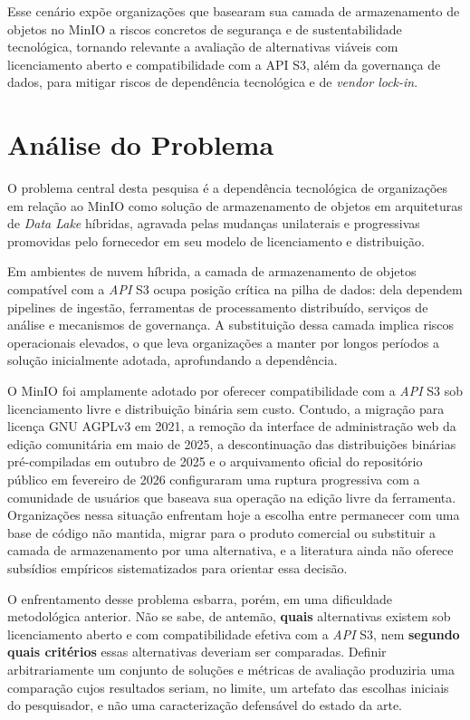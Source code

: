 Esse cenário expõe organizações que basearam sua camada de armazenamento de objetos
no MinIO a riscos concretos de segurança e de sustentabilidade tecnológica,
tornando relevante a avaliação de alternativas viáveis com licenciamento aberto e
compatibilidade com a API S3, além da governança de dados, para mitigar riscos de
dependência tecnológica e de \textit{vendor lock-in}.

\section{Análise do Problema}
\label{sec:analise-problema}

O problema central desta pesquisa é a dependência tecnológica de organizações
em relação ao MinIO como solução de armazenamento de objetos em arquiteturas
de \textit{Data Lake} híbridas, agravada pelas mudanças unilaterais e progressivas
promovidas pelo fornecedor em seu modelo de licenciamento e distribuição.

Em ambientes de nuvem híbrida, a camada de armazenamento de objetos compatível
com a \textit{API} S3 ocupa posição crítica na pilha de dados: dela dependem
pipelines de ingestão, ferramentas de processamento distribuído, serviços de
análise e mecanismos de governança. A substituição dessa camada implica riscos
operacionais elevados, o que leva organizações a manter por longos períodos a
solução inicialmente adotada, aprofundando a dependência.

O MinIO foi amplamente adotado por oferecer compatibilidade com a \textit{API} S3
sob licenciamento livre e distribuição binária sem custo. Contudo, a migração para
licença GNU AGPLv3 em 2021, a remoção da interface de administração web da edição
comunitária em maio de 2025, a descontinuação das distribuições binárias
pré-compiladas em outubro de 2025 e o arquivamento oficial do repositório público
em fevereiro de 2026 \citep{minio2026repo,devpro2025,faun2026} configuraram uma
ruptura progressiva com a comunidade de usuários que baseava sua operação na edição
livre da ferramenta. Organizações nessa situação enfrentam hoje a escolha entre
permanecer com uma base de código não mantida, migrar para o produto comercial ou
substituir a camada de armazenamento por uma alternativa, e a literatura ainda não
oferece subsídios empíricos sistematizados para orientar essa decisão.

O enfrentamento desse problema esbarra, porém, em uma dificuldade metodológica
anterior. Não se sabe, de antemão, \textbf{quais} alternativas existem sob
licenciamento aberto e com compatibilidade efetiva com a \textit{API} S3, nem
\textbf{segundo quais critérios} essas alternativas deveriam ser comparadas.
Definir arbitrariamente um conjunto de soluções e métricas de avaliação produziria
uma comparação cujos resultados seriam, no limite, um artefato das escolhas
iniciais do pesquisador, e não uma caracterização defensável do estado da arte.

